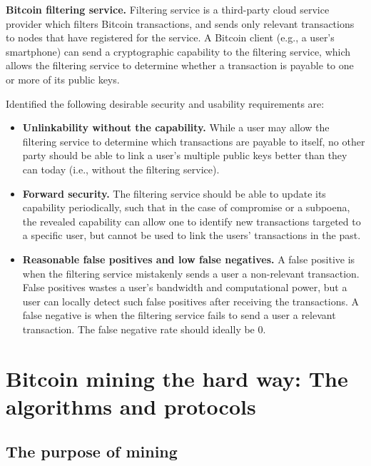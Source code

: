 \textbf{Bitcoin filtering service.} Filtering service is a third-party cloud service provider
which filters Bitcoin transactions, and sends only relevant transactions to nodes that
have registered for the service. A Bitcoin client (e.g., a user’s smartphone) can send
a cryptographic capability to the filtering service, which allows the filtering service to
determine whether a transaction is payable to one or more of its public keys\cite{kaplanov2012nerdy}.

Identified the following desirable security and usability requirements are:

\begin{itemize}
	\item \textbf{Unlinkability without the capability.} While a user may allow the filtering service
to determine which transactions are payable to itself, no other party should be able
to link a user’s multiple public keys better than they can today (i.e., without the
filtering service)\cite{brito2013bitcoin}.
	\item \textbf{Forward security.} The filtering service should be able to update its capability periodically,
such that in the case of compromise or a subpoena, the revealed capability
can allow one to identify new transactions targeted to a specific user, but cannot be
used to link the users’ transactions in the past\cite{brito2013bitcoin}.
	\item \textbf{Reasonable false positives and low false negatives.} A false positive is when the
filtering service mistakenly sends a user a non-relevant transaction. False positives
wastes a user’s bandwidth and computational power, but a user can locally detect
such false positives after receiving the transactions. A false negative is when the
filtering service fails to send a user a relevant transaction. The false negative rate
should ideally be 0\cite{brito2013bitcoin}.
\end{itemize}



\chapter{Bitcoin mining the hard way: The algorithms and protocols}
\section{The purpose of mining}

